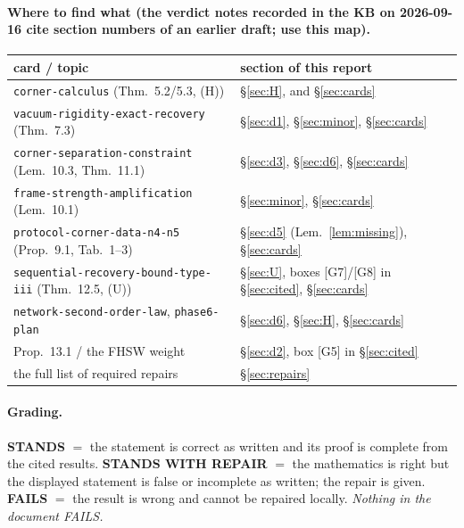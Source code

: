 \documentclass[11pt]{article}
\theoremstyle{definition}\newtheorem{example}[theorem]{Example}
\begin{document}
\paragraph{Where to find what (the verdict notes recorded in the KB on 2026-09-16 cite
section numbers of an earlier draft; use this map).}
\begin{center}\small
\begin{tabular}{@{}ll@{}}
\toprule
card / topic & section of this report\\
\midrule
\texttt{corner-calculus} (Thm.~5.2/5.3, (H)) & \S\ref{sec:H}, and \S\ref{sec:cards}\\
\texttt{vacuum-rigidity-exact-recovery} (Thm.~7.3) & \S\ref{sec:d1}, \S\ref{sec:minor},
 \S\ref{sec:cards}\\
\texttt{corner-separation-constraint} (Lem.~10.3, Thm.~11.1) & \S\ref{sec:d3},
 \S\ref{sec:d6}, \S\ref{sec:cards}\\
\texttt{frame-strength-amplification} (Lem.~10.1) & \S\ref{sec:minor}, \S\ref{sec:cards}\\
\texttt{protocol-corner-data-n4-n5} (Prop.~9.1, Tab.~1--3) & \S\ref{sec:d5}
 (Lem.~\ref{lem:missing}), \S\ref{sec:cards}\\
\texttt{sequential-recovery-bound-type-iii} (Thm.~12.5, (U)) & \S\ref{sec:U}, boxes
 [G7]/[G8] in \S\ref{sec:cited}, \S\ref{sec:cards}\\
\texttt{network-second-order-law}, \texttt{phase6-plan} & \S\ref{sec:d6}, \S\ref{sec:H},
 \S\ref{sec:cards}\\
Prop.~13.1 / the FHSW weight & \S\ref{sec:d2}, box [G5] in \S\ref{sec:cited}\\
the full list of required repairs & \S\ref{sec:repairs}\\
\bottomrule
\end{tabular}
\end{center}

\paragraph{Grading.}
\textbf{STANDS} $=$ the statement is correct as written and its proof is complete from the
cited results.  \textbf{STANDS WITH REPAIR} $=$ the mathematics is right but the displayed
statement is false or incomplete as written; the repair is given.  \textbf{FAILS} $=$ the
result is wrong and cannot be repaired locally.  \emph{Nothing in the document FAILS.}
\end{document}
